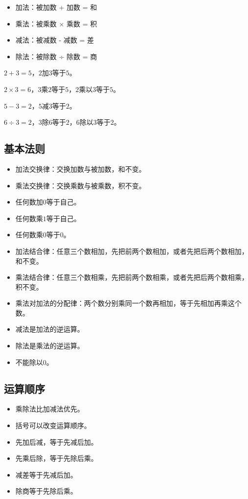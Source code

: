 \documentclass[12pt,UTF8]{ctexart}
\begin{document}
\begin{itemize}
\item 加法：被加数 + 加数 = 和
\item 乘法：被乘数 × 乘数 = 积
\item 减法：被减数 - 减数 = 差
\item 除法：被除数 ÷ 除数 = 商
\end{itemize}

\(  2 + 3 = 5  \)，\( 2 \)加\( 3 \)等于\( 5 \)。

\(  2 \times 3 = 6  \)，\( 3 \)乘\( 2 \)等于\( 5 \)，\( 2 \)乘以\( 3 \)等于\( 5 \)。

\(  5 - 3 = 2  \)，\( 5 \)减\( 3 \)等于\( 2 \)。

\(  6 \div 3 = 2  \)，\( 3 \)除\( 6 \)等于\( 2 \)，\( 6 \)除以\( 3 \)等于\( 2 \)。

\subsection{基本法则}

\begin{itemize}
\item 加法交换律：交换加数与被加数，和不变。
\item 乘法交换律：交换乘数与被乘数，积不变。
\item 任何数加\( 0 \)等于自己。
\item 任何数乘\( 1 \)等于自己。
\item 任何数乘\( 0 \)等于\( 0 \)。
\item 加法结合律：任意三个数相加，先把前两个数相加，或者先把后两个数相加，和不变。
\item 乘法结合律：任意三个数相乘，先把前两个数相乘，或者先把后两个数相乘，积不变。
\item 乘法对加法的分配律：两个数分别乘同一个数再相加，等于先相加再乘这个数。
\item 减法是加法的逆运算。
\item 除法是乘法的逆运算。
\item 不能除以\( 0 \)。
\end{itemize}

\subsection{运算顺序}

\begin{itemize}
\item 乘除法比加减法优先。
\item 括号可以改变运算顺序。
\item 先加后减，等于先减后加。
\item 先乘后除，等于先除后乘。
\item 减差等于先减后加。
\item 除商等于先除后乘。
\end{itemize}
\end{document}
